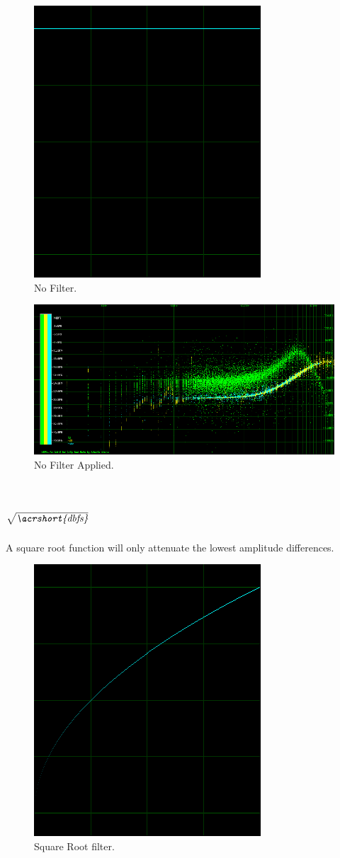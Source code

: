 \documentclass[10pt,a4paper]{report}
\begin{document}
\begin{appendices}
\begin{figure}[H]
	\centering
	\includegraphics[width=0.4\linewidth]{images/colorfilter/BetaFunctionPlot_0.png}
	\caption[No Filter]{No Filter.}
	\label{fig:betafunctionplot0}
\end{figure}

\begin{figure}[H]
	\centering
	\includegraphics[width=1\linewidth]{images/colorfilter/BetaFunctionPlot_0_Data.png}
	\caption[No Filter]{No Filter Applied.}
	\label{fig:betafunctionplot0data}
\end{figure}

\section{$\sqrt{\textit{\acrshort{dbfs}}}$} 

A square root function will only attenuate the lowest amplitude differences.

\begin{figure}[H]
	\centering
	\includegraphics[width=0.4\linewidth]{images/colorfilter/BetaFunctionPlot_1.png}
	\caption[Square Root filter]{Square Root filter.}
	\label{fig:betafunctionplot1}
\end{figure}


\end{appendices}
\end{document}
